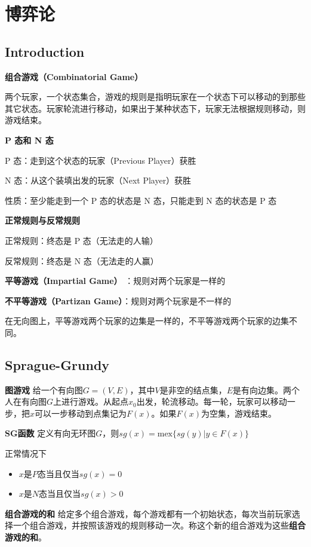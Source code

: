 \section{博弈论}

\subsection{Introduction}

\textbf{组合游戏（Combinatorial Game）}

两个玩家，一个状态集合，游戏的规则是指明玩家在一个状态下可以移动的到那些其它状态。玩家轮流进行移动，如果出于某种状态下，玩家无法根据规则移动，则游戏结束。

\textbf{P 态和 N 态}

P 态：走到这个状态的玩家（Previous Player）获胜

N 态：从这个装填出发的玩家（Next Player）获胜

性质：至少能走到一个 P 态的状态是 N 态，只能走到 N 态的状态是 P 态

\textbf{正常规则与反常规则}

正常规则：终态是 P 态（无法走的人输）

反常规则：终态是 N 态（无法走的人赢）

\textbf{平等游戏（Impartial Game）} ：规则对两个玩家是一样的

\textbf{不平等游戏（Partizan Game）}：规则对两个玩家是不一样的

在无向图上，平等游戏两个玩家的边集是一样的，不平等游戏两个玩家的边集不同。

\subsection{Sprague-Grundy}

\textbf{图游戏} 给一个有向图$G=(V,E)$，其中$V$是非空的结点集，$E$是有向边集。两个人在有向图$G$上进行游戏。从起点$x_0$出发，轮流移动。每一轮，玩家可以移动一步，把$x$可以一步移动到点集记为$F(x)$。如果$F(x)$为空集，游戏结束。

\textbf{SG函数} 定义有向无环图$G$，则$sg(x) = \mathrm{mex}\{ sg(y) | y \in F(x) \}$

正常情况下
\begin{itemize}
    \item $x$是$P$态当且仅当$sg(x) = 0$
    \item $x$是$N$态当且仅当$sg(x) > 0$
\end{itemize}

\textbf{组合游戏的和} 给定多个组合游戏，每个游戏都有一个初始状态，每次当前玩家选择一个组合游戏，并按照该游戏的规则移动一次。称这个新的组合游戏为这些\textbf{组合游戏的和}。

